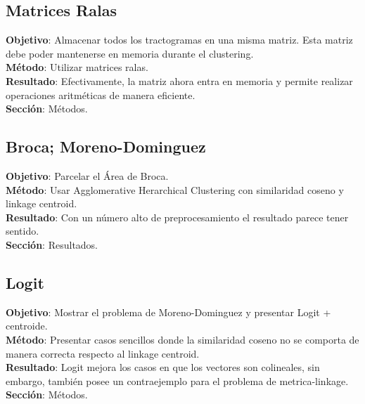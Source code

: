 \subsection{Matrices Ralas}
\textbf{Objetivo}:  Almacenar todos los tractogramas en una misma matriz. Esta 
                    matriz debe poder mantenerse en memoria durante el clustering.\\
\textbf{M\'etodo}:  Utilizar matrices ralas. \\
\textbf{Resultado}: Efectivamente, la matriz ahora entra en memoria y permite 
                    realizar operaciones aritm\'eticas de manera eficiente.\\
\textbf{Secci\'on}: M\'etodos.\\                    

\subsection{Broca; Moreno-Dominguez}
\textbf{Objetivo}:  Parcelar el \'Area de Broca.\\
\textbf{M\'etodo}:  Usar Agglomerative Herarchical Clustering con similaridad
                    coseno y linkage centroid. \\
\textbf{Resultado}: Con un n\'umero alto de preprocesamiento el resultado parece
                    tener sentido.\\
\textbf{Secci\'on}: Resultados.\\                    
                    
\subsection{Logit}
\textbf{Objetivo}:  Mostrar el problema de Moreno-Dominguez y presentar Logit
                    + centroide.\\
\textbf{M\'etodo}:  Presentar casos sencillos donde la similaridad coseno no
                    se comporta de manera correcta respecto al linkage centroid. \\
\textbf{Resultado}: Logit mejora los casos en que los vectores son colineales,
                    sin embargo, tambi\'en posee un contraejemplo para el 
                    problema de metrica-linkage.\\
\textbf{Secci\'on}: M\'etodos.\\                                        
                    
